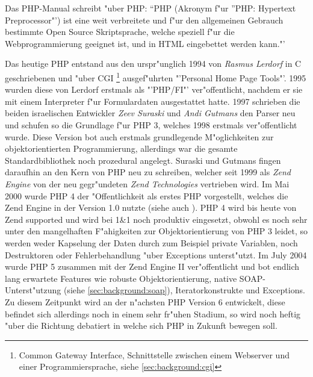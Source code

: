 Das PHP-Manual \cite{PHPMAN} schreibt "uber PHP: "`PHP (Akronym f"ur "'PHP: Hypertext Preprocessor"') 
ist eine weit verbreitete und f"ur den allgemeinen Gebrauch bestimmte Open Source Skriptsprache, 
welche speziell f"ur die Webprogrammierung geeignet ist, und in HTML eingebettet werden kann."'

Das heutige PHP entstand aus den urspr"unglich 1994 von \emph{Rasmus Lerdorf} in C geschriebenen und "uber CGI
\footnote{Common Gateway Interface, Schnittstelle zwischen einem Webserver und einer Programmiersprache, siehe \ref{sec:background:cgi}}
ausgef"uhrten "'Personal Home Page Tools"'. 1995 wurden diese von Lerdorf erstmals als "'PHP/FI"' ver"offentlicht,
nachdem er sie mit einem Interpreter f"ur Formulardaten ausgestattet hatte.
1997 schrieben die beiden israelischen Entwickler \emph{Zeev Suraski} und \emph{Andi Gutmans} den Parser neu und
schufen so die Grundlage f"ur PHP 3, welches 1998 erstmals ver"offentlicht wurde. Diese Version bot auch 
erstmals grundlegende M"oglichkeiten zur objektorientierten Programmierung, allerdings war die gesamte 
Standardbibliothek noch prozedural angelegt.
Suraski und Gutmans fingen daraufhin an den Kern von PHP neu zu schreiben, welcher seit 1999 als \emph{Zend Engine}
von der neu gegr"undeten \emph{Zend Technologies} vertrieben wird. Im Mai 2000 wurde PHP 4 der
"Offentlichkeit als erstes PHP vorgestellt, welches die Zend Engine in der Version 1.0 nutzte (siehe auch \cite{ZENDENGINE}).
PHP 4 wird bis heute von Zend supported und wird bei 1\&1 noch produktiv eingesetzt, obwohl es noch sehr unter den
mangelhaften F"ahigkeiten zur Objektorientierung von PHP 3 leidet, so werden weder Kapselung der Daten durch 
zum Beispiel private Variablen, noch Destruktoren oder Fehlerbehandlung "uber Exceptions unterst"utzt.
Im July 2004 wurde PHP 5 zusammen mit der Zend Engine II ver"offentlicht und bot endlich lang erwartete Features wie
robuste Objektorientierung, native SOAP-Unterst"utzung (siehe \ref{sec:background:soap}), 
Iteratorkonstrukte und Exceptions. Zu diesem Zeitpunkt wird an der n"achsten PHP Version 6 entwickelt, diese
befindet sich allerdings noch in einem sehr fr"uhen Stadium, so wird noch heftig "uber die Richtung
debatiert in welche sich PHP in Zukunft bewegen soll.  

